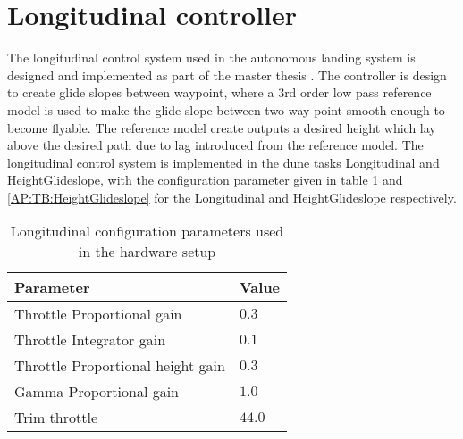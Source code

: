 \section{Longitudinal controller}
The longitudinal control system used in the autonomous landing system is designed and implemented as part of the master thesis \citep{Sigurd}. The controller is design to create glide slopes between waypoint, where a 3rd order low pass reference model is used to make the glide slope between two way point smooth enough to become flyable. The reference model create outputs a desired height which lay above the desired path due to lag introduced from the reference model. The longitudinal control system is implemented in the \gls{dune} tasks Longitudinal and HeightGlideslope, with the configuration parameter given in table \ref{AP:TB:Longitudianl} and \ref{AP:TB:HeightGlideslope} for the Longitudinal and HeightGlideslope respectively.
\begin{table}[H]
\centering
\begin{tabular}{| l | l |}
\hline
\textbf{Parameter}	&	\textbf{Value} \\ \hline
Throttle Proportional gain          &    $0.3$ \\ \hline
Throttle Integrator gain            &    $0.1$ \\ \hline
Throttle Proportional height gain   &    $0.3$ \\ \hline
Gamma Proportional gain             &    $1.0$ \\ \hline
Trim throttle                       &    $44.0$ \\ \hline
\end{tabular}
\caption{Longitudinal configuration parameters used in the hardware setup}
\label{AP:TB:Longitudianl}
\end{table}

